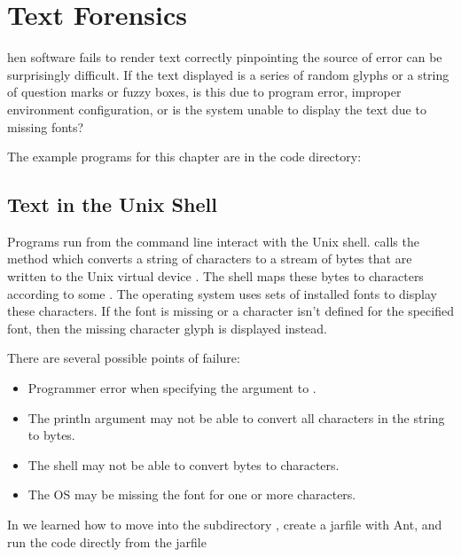 \chapter{Text Forensics}\label{chap:forensics}

hen software fails to render text correctly
pinpointing the source of error can be surprisingly difficult.
If the text displayed is a series of random glyphs or a string of
question marks or fuzzy boxes, is this due to program error,
improper environment configuration, or is the system unable to
display the text due to missing fonts?

The example programs for this chapter are in the code directory:
%



\section{Text in the Unix Shell}

Programs run from the command line interact with the Unix shell.
 calls the  method
which converts a string of characters to a stream of bytes that are written to the Unix virtual device .
%
%
The shell maps these bytes to characters according to some .
The operating system uses sets of installed fonts to display these characters.
If the font is missing or a character isn't defined for the specified font,
then the missing character glyph is displayed instead.

There are several possible points of failure:  
\begin{itemize}
\item Programmer error when specifying the argument to .%
\item The println argument may not be able to convert all characters in the string to bytes.%
\item The shell may not be able to convert bytes to characters.%
\item The OS may be missing the font for one or more characters.%
\end{itemize}

In  we learned
how to move into the subdirectory ,
create a jarfile with Ant, and run the code directly from the jarfile
%
%



